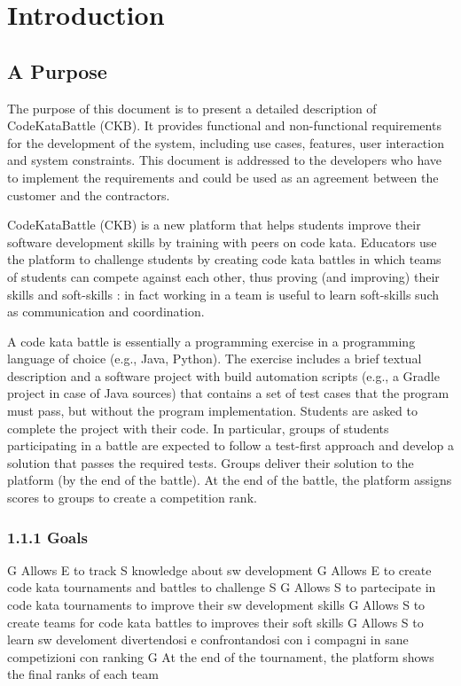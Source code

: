 \chapter{Introduction}
\section{A Purpose}
The purpose of this document is to present a detailed description of CodeKataBattle (CKB). It provides functional and non-functional requirements for the development of the
system, including use cases, features, user interaction and system constraints. This document is addressed to the developers who have to implement the requirements and
could be used as an agreement between the customer and the contractors.

CodeKataBattle (CKB) is a new platform that helps students improve their software development skills by training with peers on code kata. Educators use the platform to challenge students by creating code 
kata battles in which teams of students can compete against each other, thus proving (and improving) their skills and soft-skills : in fact working in a team is useful to learn soft-skills such as 
communication and coordination.

A code kata battle is essentially a programming exercise in a programming language of choice (e.g., 
Java, Python). The exercise includes a brief textual description and a software project with build 
automation scripts (e.g., a Gradle project in case of Java sources) that contains a set of test cases that 
the program must pass, but without the program implementation. Students are asked to complete the 
project with their code. In particular, groups of students participating in a battle are expected to follow 
a test-first approach and develop a solution that passes the required tests. Groups deliver their
solution to the platform (by the end of the battle). At the end of the battle, the platform assigns scores 
to groups to create a competition rank.

   \subsection{ 1.1.1 Goals}
        G Allows E to track S knowledge about sw development
        G Allows E to create code kata tournaments and battles to challenge S
        G Allows S to partecipate in code kata tournaments to improve their sw development skills 
        G Allows S to create teams for code kata battles to improves their soft skills
        G Allows S to learn sw develoment divertendosi e confrontandosi con i compagni in sane competizioni con ranking
        G At the end of the tournament, the platform shows the final ranks of each team 

